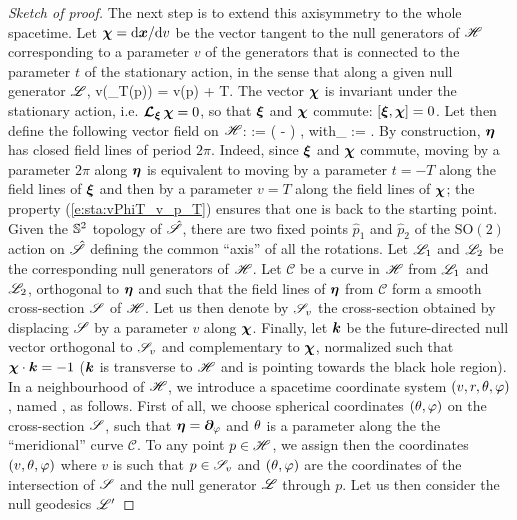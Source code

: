 \begin{proof}[Sketch of proof]
The next step is to extend this axisymmetry to the whole spacetime.
Let $\bm{\chi}=\mathrm{d}\bm{x}/\mathrm{d} v$ be the vector tangent to the null generators of $\mathscr{H}$
corresponding to a parameter $v$ of the generators that is connected to the parameter
$t$ of the stationary action, in the sense that along a given null generator
$\mathscr{L}$,
\be
\label{e:sta:vPhiT_v_p_T}
    v(\Phi_T(p)) = v(p) + T.
\ee
The vector $\bm{\chi}$ is invariant
under the stationary action, i.e. $\bm{\mathcal{L}}_{\bm{\xi}}\, \bm{\chi} = 0$, so that
$\bm{\xi}$ and $\bm{\chi}$ commute: $[\bm{\xi}, \bm{\chi}] = 0$.
Let then define the following vector field on $\mathscr{H}$:
\be \label{e:sta:def_eta_rigidity}
    \w{\eta} :=  \left( \w{\chi} - \w{\xi} \right) ,
    \qquad \mbox{with}\quad \Omega_{\Hor} :=  .
\ee
By construction, $\bm{\eta}$ has closed field lines of period $2\pi$.
Indeed, since $\bm{\xi}$ and $\bm{\chi}$ commute, moving by a parameter $2\pi$
along $\bm{\eta}$ is equivalent to moving by a parameter $t=-T$ along the field
lines of $\bm{\xi}$ and then by a parameter $v=T$ along the field lines of
$\bm{\chi}$; the property (\ref{e:sta:vPhiT_v_p_T}) ensures that one is back
to the starting point.
Given the $\mathbb{S}^2$
topology of $\hat{\mathscr{S}}$, there are two fixed points $\hat{p}_1$ and $\hat{p}_2$ of the
$\mathrm{SO}(2)$ action on $\hat{\mathscr{S}}$
defining the common ``axis'' of all the rotations.
Let $\mathscr{L}_1$ and $\mathscr{L}_2$ be the corresponding
null generators of $\mathscr{H}$. Let $\mathscr{C}$ be a curve in $\mathscr{H}$
from $\mathscr{L}_1$ and $\mathscr{L}_2$, orthogonal to $\bm{\eta}$ and
such that the field lines of $\bm{\eta}$ from $\mathscr{C}$ form
a smooth cross-section $\mathscr{S}$ of $\mathscr{H}$. Let us then denote by $\mathscr{S}_v$ the
cross-section obtained by displacing $\mathscr{S}$ by a parameter $v$ along $\bm{\chi}$.
Finally, let $\bm{k}$ be the future-directed null vector orthogonal to $\mathscr{S}_v$ and complementary
to $\bm{\chi}$, normalized such that $\bm{\chi}\cdot\bm{k} = -1$ ($\bm{k}$ is
transverse to $\mathscr{H}$ and is pointing towards the black hole region).
In a neighbourhood of $\mathscr{H}$, we introduce a spacetime coordinate system $(v,r,\theta,\varphi)$,
named , as follows.
First of all, we choose spherical coordinates $(\theta,\varphi)$ on the cross-section
$\mathscr{S}$, such that $\bm{\eta} = \bm{\partial}_\varphi$ and $\theta$ is a parameter along the
the ``meridional'' curve $\mathscr{C}$. To any point $p\in\mathscr{H}$, we assign
then the coordinates $(v,\theta,\varphi)$ where $v$ is such that $p\in \mathscr{S}_v$
and $(\theta,\varphi)$ are the coordinates
of the intersection of $\mathscr{S}$ and the null generator $\mathscr{L}$ through $p$.
Let us then consider the null geodesics $\mathscr{L}'$

\end{proof}
